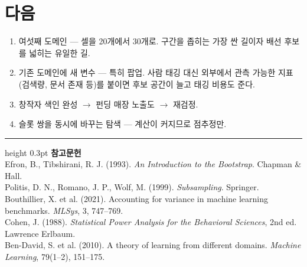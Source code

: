 \documentclass[10pt]{article}
\begin{document}
\section{다음}

\begin{enumerate}[leftmargin=1.3em,itemsep=0.15em]
\item 여섯째 도메인 --- 셀을 20개에서 30개로. 구간을 좁히는 가장 싼 길이자
      배선 후보를 넓히는 유일한 길.
\item 기존 도메인에 새 변수 --- 특히 팝업. 사람 태깅 대신 외부에서 관측 가능한
      지표(검색량, 문서 존재 등)를 붙이면 후보 공간이 늘고 태깅 비용도 준다.
\item 창작자 색인 완성 $\to$ 펀딩 매장 노출도 $\to$ 재검정.
\item 슬롯 쌍을 동시에 바꾸는 탐색 --- 계산이 커지므로 점추정만.
\end{enumerate}

\vspace{0.6em}
\hrule height 0.3pt
\vspace{0.5em}
{\footnotesize
\textbf{참고문헌}\\[0.3em]
Efron, B., Tibshirani, R. J. (1993). \emph{An Introduction to the Bootstrap}.
Chapman \& Hall.\\[0.15em]
Politis, D. N., Romano, J. P., Wolf, M. (1999). \emph{Subsampling}. Springer.\\[0.15em]
Bouthillier, X. et al. (2021). Accounting for variance in machine learning
benchmarks. \emph{MLSys}, 3, 747--769.\\[0.15em]
Cohen, J. (1988). \emph{Statistical Power Analysis for the Behavioral Sciences},
2nd ed. Lawrence Erlbaum.\\[0.15em]
Ben-David, S. et al. (2010). A theory of learning from different domains.
\emph{Machine Learning}, 79(1--2), 151--175.
}
\end{document}
